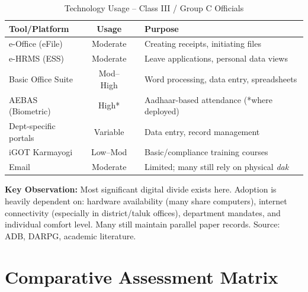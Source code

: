 \documentclass[12pt,a4paper]{article}
\begin{document}
\begin{table}[H]
\centering
\caption{Technology Usage  --  Class III / Group C Officials}
\label{tab:class3}
\begin{tabularx}{\textwidth}{@{}lcp{1cm}X@{}}
\toprule
\textbf{Tool/Platform} & \textbf{Usage} & & \textbf{Purpose} \\
\midrule
e-Office (eFile) & Moderate & & Creating receipts, initiating files \\
e-HRMS (ESS) & Moderate & & Leave applications, personal data views \\
Basic Office Suite & Mod--High & & Word processing, data entry, spreadsheets \\
AEBAS (Biometric) & High* & & Aadhaar-based attendance (*where deployed) \\
Dept-specific portals & Variable & & Data entry, record management \\
iGOT Karmayogi & Low--Mod & & Basic/compliance training courses \\
Email & Moderate & & Limited; many still rely on physical \textit{dak} \\
\bottomrule
\end{tabularx}
\end{table}

\textbf{Key Observation:} Most significant digital divide exists here. Adoption is heavily dependent on: hardware availability (many share computers), internet connectivity (especially in district/taluk offices), department mandates, and individual comfort level. Many still maintain parallel paper records. Source: ADB, DARPG, academic literature.

\section{Comparative Assessment Matrix}
\end{document}
